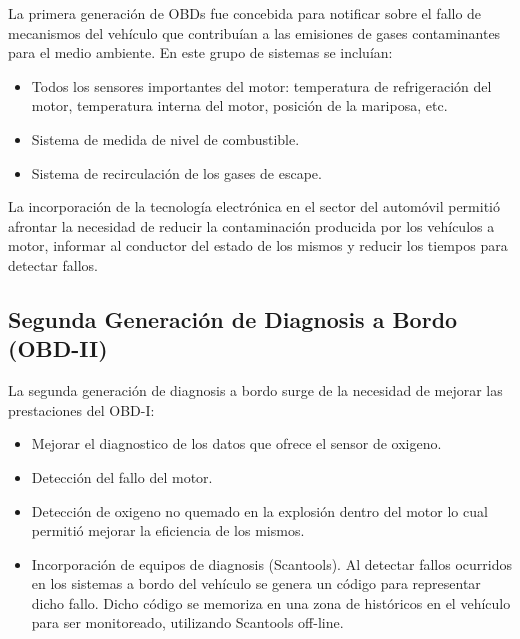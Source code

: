 La primera generación de OBDs fue concebida para notificar sobre el fallo de mecanismos del vehículo que contribuían a las emisiones de gases contaminantes para el medio ambiente. En este grupo de sistemas se incluían:

\begin{itemize}
\item Todos los sensores importantes del motor: temperatura de refrigeración del motor, temperatura interna del motor, posición de la mariposa, etc.
\item Sistema de medida de nivel de combustible.
\item Sistema de recirculación de los gases de escape.
\end{itemize}

La incorporación de la tecnología electrónica en el sector del automóvil permitió afrontar la necesidad de reducir la contaminación producida por los vehículos a motor, informar al conductor del estado de los mismos y reducir los tiempos para detectar fallos.

\subsection {Segunda Generación de Diagnosis a Bordo (OBD-II)}
La segunda generación de diagnosis a bordo surge de la necesidad de mejorar las prestaciones del OBD-I:

\begin {itemize}
\item Mejorar el diagnostico de los datos que ofrece el sensor de oxigeno.
\item Detección del fallo del motor.
\item Detección de oxigeno no quemado en la explosión dentro del motor lo cual permitió mejorar la eficiencia de los mismos.
\item Incorporación de equipos de diagnosis (Scantools). Al detectar fallos ocurridos en los sistemas a bordo del vehículo se genera un código para representar dicho fallo. Dicho código se memoriza en una zona de históricos en el vehículo para ser monitoreado, utilizando Scantools off-line. 
\end{itemize}

